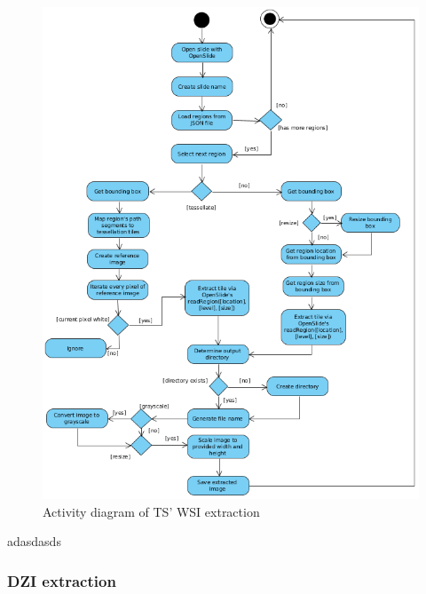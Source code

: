 \begin{figure}[H]
	\begin{center}
		\includegraphics[scale=0.5]{img/ts_wsi_uml.png}
		\caption{Activity diagram of TS' WSI extraction}
		\label{fig5_tsWsiUml}
	\end{center}
\end{figure}

adasdasds

\subsubsection{DZI extraction}

